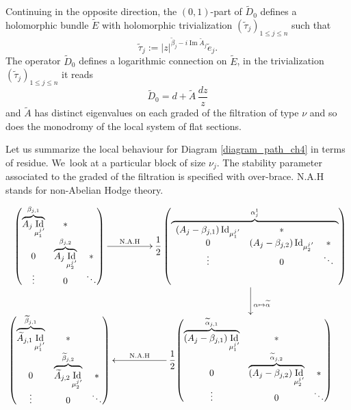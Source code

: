 \documentclass[11pt]{article}
\newcommand\mto{\mathchoice{\longmapsto}{\mapsto}{\mapsto}{\mapsto}}
\theoremstyle{definition}
\theoremstyle{plain}
\DeclareMathOperator{\Id}{Id}
\DeclareMathOperator{\Imm}{Im}
\begin{document}
Continuing in the opposite direction, the $(0,1)$-part of $\widetilde{D}_0$ defines a holomorphic bundle $\widetilde{E}$ with holomorphic trivialization $(\widetilde{\tau}_j)_{1\le j\le n}$ such that
\[
\widetilde{\tau}_j:=|z|^{\widetilde{\beta}_j- i \Imm \widetilde{A}_j} \widetilde{e}_j.
\]
The operator $\widetilde{D}_0$ defines a logarithmic connection on $\widetilde{E}$, in the trivialization $(\widetilde{\tau}_j)_{1\le j\le n}$ it reads
\[
\widetilde{D}_0 = d + \widetilde{A}\,\frac{d z}{z}
\]
and $\widetilde{A}$ has distinct eigenvalues on each graded of the filtration of type $\nu$ and so does the monodromy of the local system of flat sections.

Let us summarize the local behaviour for Diagram \eqref{diagram_path_ch4} in terms of residue. We~look at a particular block of size $\nu_j$. The stability parameter associated to the graded of the filtration is specified with over-brace. N.A.H stands for non-Abelian Hodge theory.
\[
\xymatrix@C=1.5cm{
\hbox{$\begin{pmatrix}
\overbrace{A_j \Id_{ {\mu^j_{1}}' }}^{\beta_{j,1}} & *& \\
0 & \overbrace{A_j \Id_{ {\mu^j_{2}}' }}^{\beta_{j,2}} & *\\
\vdots & 0 & \ddots
\end{pmatrix}$} \ar[r]^-{\text{N.A.H}} &
\dfrac{1}{2}\left(
\overbrace{
\begin{array}{ccccc}
(A_j-\beta_{j,1}) \Id_{ {\mu^j_{1}}' } & * & \\
0 & (A_j-\beta_{j,2}) \Id_{ {\mu^j_{2}}' } & * \\
\vdots & 0 & \ddots
\end{array}
}^{\alpha^1_j }
\right) \ar[d]^{\alpha \mto \widetilde{\alpha}} \\
\hbox{$\begin{pmatrix}
\overbrace{\widetilde{A}_{j,1} \Id_{ {\mu^j_{1}}' }}^{\widetilde{\beta}_{j,1}} & *& \\
0 & \overbrace{\widetilde{A}_{j,2} \Id_{ {\mu^j_{2}}' }}^{\widetilde{\beta}_{j,2}} & *\\
\vdots & 0 & \ddots
\end{pmatrix}$} & \ar[l]_-{\text{N.A.H}}
\dfrac{1}{2}\hbox{$\begin{pmatrix}
\overbrace{\left(A_j-\beta_{j,1}\right) \Id_{ {\mu^j_{1}}' }}^{\widetilde{\alpha}_{j,1}} & *& \\
0 & \overbrace{\left(A_j-\beta_{j,2}\right) \Id_{{\mu^j_{2}}' }}^{\widetilde{\alpha}_{j,2}} & *\\
\vdots & 0 & \ddots
\end{pmatrix}$}
}
\]
\end{document}
